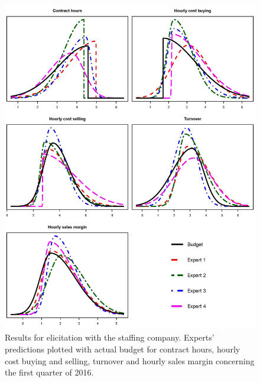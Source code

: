 \documentclass[openright,titlepage,12pt,a4paper]{book}
\begin{document}
\begin{figure}

{\centering \includegraphics[width=0.75\linewidth]{figures/chapter_2/Figure_4} 

}

\caption{Results for elicitation with the staffing company. Experts' predictions plotted with actual budget for contract hours, hourly cost buying and selling, turnover and hourly sales margin concerning the first quarter of 2016.}\label{fig:ch02fig4}
\end{figure}

\newpage
\end{document}
